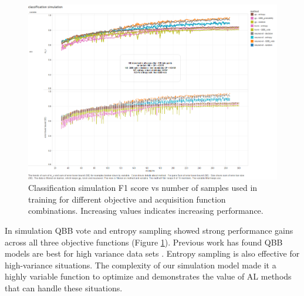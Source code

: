 \documentclass{sig-alternate}
\begin{document}
\begin{figure}[tbph]
\centering
\includegraphics[width=\linewidth]{classification_simulation}
\caption{Classification simulation F1 score vs number of samples used in training for different objective and acquisition function combinations. Increasing values indicates increasing performance.}
\label{fig:cls_sim}
\end{figure}
In simulation QBB vote and entropy sampling showed strong performance gains across all three objective functions (Figure \ref{fig:cls_sim}).
Previous work has found QBB models are best for high variance data sets \cite{schein2007:al-logreg-eval}.
Entropy sampling is also effective for high-variance situations.
The complexity of our simulation model made it a highly variable function to optimize and demonstrates the value of AL methods that can handle these situations.
\end{document}
